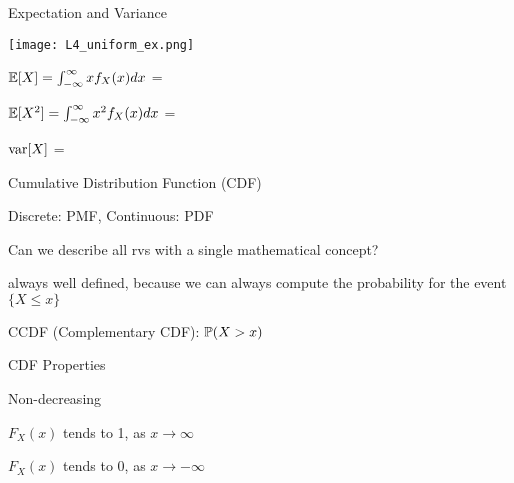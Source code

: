 \documentclass[handout,fleqn,aspectratio=169]{beamer}
\begin{document}
\begin{frame}{Expectation and Variance}


\texttt{[image: L4\_uniform\_ex.png]}

\bigskip

\plitemsep 0.1in
\bci 
\item $\mathbb{E}[ X ] = \int_{-\infty}^{\infty} x f_X(x) dx$ = 

\item $\mathbb{E}[ X^2 ] = \int_{-\infty}^{\infty} x^2 f_X(x) dx$ = 

\item $\text{var}[ X ]$ = 
\eci 


\end{frame}

\begin{frame}{Cumulative Distribution Function (CDF)}

{
\small
\vspace{0.1in}
\plitemsep 0.1in
\bci 
\item<1-> Discrete: PMF, Continuous: PDF
\item<2-> Can we describe all rvs with a single mathematical concept? 
\item<4-> always well defined, because we can always compute the probability for the event $\{X \le x \}$

\item<5-> CCDF (Complementary CDF): $\mathbb{P}( X > x  )$
\eci 
}
{

}
\end{frame}

\begin{frame}{CDF Properties}


\bigskip

\plitemsep 0.3in
\bci 
\item<2-> Non-decreasing

\item<3-> $F_X(x)$ tends to 1, as $x \rightarrow \infty$

\item<3-> $F_X(x)$ tends to 0, as $x \rightarrow -\infty$

\eci 
\bigskip

\end{frame}
\end{document}
